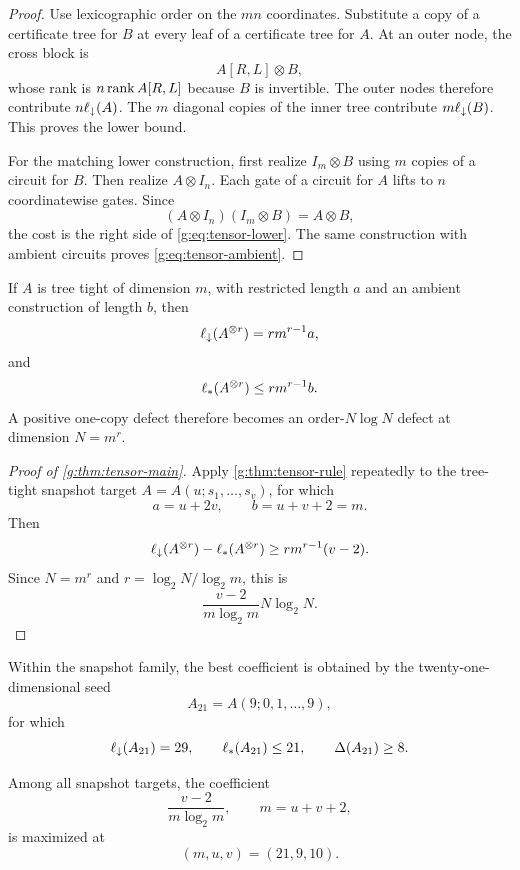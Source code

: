 \begin{proof}
Use lexicographic order on the $mn$ coordinates.  Substitute a copy of a certificate tree for $B$ at every leaf of a certificate tree for $A$.  At an outer node, the cross block is
\[
A[R,L]\otimes B,
\]
whose rank is $n\operatorname{rank} A[R,L]$ because $B$ is invertible.  The outer nodes therefore contribute $n\ell_{\downarrow}(A)$.  The $m$ diagonal copies of the inner tree contribute $m\ell_{\downarrow}(B)$.  This proves the lower bound.

For the matching lower construction, first realize $I_m\otimes B$ using $m$ copies of a circuit for $B$.  Then realize $A\otimes I_n$.  Each gate of a circuit for $A$ lifts to $n$ coordinatewise gates.  Since
\[
(A\otimes I_n)(I_m\otimes B)=A\otimes B,
\]
the cost is the right side of \cref{g:eq:tensor-lower}.  The same construction with ambient circuits proves \cref{g:eq:tensor-ambient}.
\end{proof}

If $A$ is tree tight of dimension $m$, with restricted length $a$ and an ambient construction of length $b$, then
\begin{equation}\label{g:eq:tensor-power-lower}
\ell_{\downarrow}(A^{\otimes r})
=
r m^{r-1}a,
\end{equation}
and
\begin{equation}\label{g:eq:tensor-power-upper}
\ell_{*}(A^{\otimes r})
\le
r m^{r-1}b.
\end{equation}
A positive one-copy defect therefore becomes an order-$N\log N$ defect at dimension $N=m^r$.

\begin{proof}[Proof of \cref{g:thm:tensor-main}]
Apply \cref{g:thm:tensor-rule} repeatedly to the tree-tight snapshot target $A=A(u;s_1,\ldots,s_v)$, for which
\[
a=u+2v,
\qquad
b=u+v+2=m.
\]
Then
\[
\ell_{\downarrow}(A^{\otimes r})
-
\ell_{*}(A^{\otimes r})
\ge
r m^{r-1}(v-2).
\]
Since $N=m^r$ and $r=\log_2N/\log_2m$, this is
\[
\frac{v-2}{m\log_2m}N\log_2N.
\]
\end{proof}

Within the snapshot family, the best coefficient is obtained by the twenty-one-dimensional seed
\[
A_{21}=A(9;0,1,\ldots,9),
\]
for which
\[
\ell_{\downarrow}(A_{21})=29,
\qquad
\ell_{*}(A_{21})\le21,
\qquad
\Delta(A_{21})\ge8.
\]

\begin{proposition}\label{g:prop:optimal-snapshot-seed}
Among all snapshot targets, the coefficient
\[
\frac{v-2}{m\log_2m},
\qquad m=u+v+2,
\]
is maximized at
\[
(m,u,v)=(21,9,10).
\]
\end{proposition}

